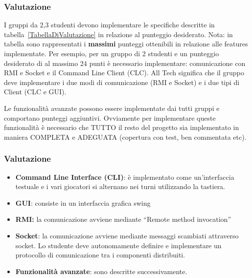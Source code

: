 \documentclass{beamer}
\begin{document}
\begin{frame}
\frametitle{Valutazione}
I gruppi da 2,3 studenti devono implementare  le specifiche
descritte in tabella~\ref{TabellaDiValutazione} in relazione al
punteggio desiderato. Nota: in tabella sono rappresentati i
\textbf{massimi} punteggi ottenibili in relazione alle features
implementate. Per esempio, per un gruppo di 2 studenti e un punteggio
desiderato di al massimo 24 punti \`e necessario implementare:
comunicazione con RMI e Socket e il Command Line Client (CLC).
All Tech significa che il gruppo deve implementare i due modi di
comunicazione (RMI e Socket) e i due tipi di Client (CLC e GUI).

Le funzionalit\`a avanzate possono essere implementate dai tutti gruppi e comportano punteggi aggiuntivi. Ovviamente per implementare queste funzionalit\`a \`e necessario che TUTTO il resto del progetto sia implementato in maniera COMPLETA e ADEGUATA (copertura con test, ben commentata etc).
\end{frame}



\begin{frame}
\frametitle{Valutazione}
\begin{itemize}
\item \textbf{Command Line Interface (CLI)}: \`e implementato come un'interfaccia testuale e i vari giocatori si alternano nei turni utilizzando la tastiera.
\item \textbf{GUI}: consiste in un interfaccia grafica swing
\item \textbf{RMI:} la comunicazione avviene mediante ``Remote method invocation''
\item \textbf{Socket}: la comunicazione avviene mediante messaggi scambiati
  attraverso socket. Lo studente deve autonomamente definire e
  implementare un protocollo di comunicazione tra i componenti distribuiti.
\item \textbf{Funzionalit\`a avanzate}: sono descritte successivamente.
\end{itemize}
\end{frame}
\end{document}
